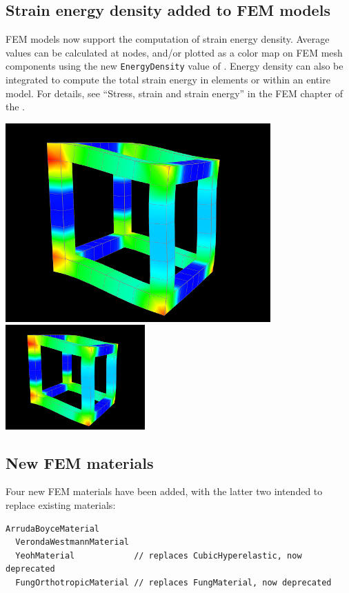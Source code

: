 \documentclass{article}
\begin{document}
\subsection{Strain energy density added to FEM models}

FEM models now support the computation of strain energy density.  Average
values can be calculated at nodes, and/or plotted as a color map on FEM mesh
components using the new {\tt EnergyDensity} value of
.
Energy density can also be integrated to compute the
total strain energy in elements or within an entire model.
For details, see ``Stress, strain and strain energy'' in the FEM chapter of the
.
%
\begin{center}
\iflatexml
 \includegraphics[]{images/strainEnergyPlot}
\else
 \includegraphics[width=0.4\textwidth]{images/strainEnergyPlot}
\fi
\end{center}
%

\subsection{New FEM materials}

Four new FEM materials have been added, with the latter two intended to replace
existing materials:
%
%
\begin{lstlisting}[]
  ArrudaBoyceMaterial
  VerondaWestmannMaterial
  YeohMaterial            // replaces CubicHyperelastic, now deprecated
  FungOrthotropicMaterial // replaces FungMaterial, now deprecated
\end{lstlisting}
%
\end{document}
